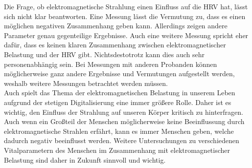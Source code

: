 Die Frage, ob elektromagnetische Strahlung einen Einfluss auf die \acs{HRV} hat, lässt sich nicht klar beantworten. Eine Messung lässt die Vermutung zu, dass es einen möglichen negativen Zusammenhang geben kann. Allerdings zeigen andere Parameter genau gegenteilige Ergebnisse. Auch eine weitere Messung spricht eher dafür, dass es keinen klaren Zusammenhang zwischen elektromagnetischer Belastung und der \acs{HRV} gibt. Nichtsdestotrotz kann dies auch sehr personenabhängig sein. Bei Messungen mit anderen Probanden können möglicherweise ganz andere Ergebnisse und Vermutungen aufgestellt werden, weshalb weitere Messungen betrachtet werden müssen. \\
Auch spielt das Thema der elektromagnetischen Belastung in unserem Leben aufgrund der stetigen Digitalisierung eine immer größere Rolle. Daher ist es wichtig, den Einfluss der Strahlung auf unseren Körper kritisch zu hinterfragen. Auch wenn ein Großteil der Menschen möglicherweise keine Beeinflussung durch elektromagnetische Strahlen erfährt, kann es immer Menschen geben, welche dadurch negativ beeinflusst werden. Weitere Untersuchungen zu verschiedenen Vitalparametern des Menschen im Zusammenhang mit elektromagnetischer Belastung sind daher in Zukunft sinnvoll und wichtig. \\


